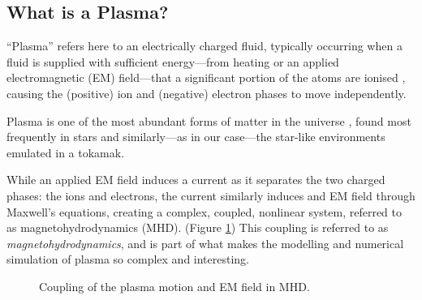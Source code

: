 \subsection{What is a Plasma?}
    \begin{definition}[Plasma]
        ``Plasma'' refers here to an electrically charged fluid, typically occurring when a fluid is supplied with sufficient energy—from heating or an applied electromagnetic (EM) field—that a significant portion of the atoms  are ionised , causing the (positive) ion and (negative) electron phases to move independently.
    \end{definition}
    Plasma is one of the most abundant forms of matter in the universe \cite{CL13}, found most frequently in stars \cite{Phi95, Asc06, Pie17} and similarly—as in our case—the star-like environments emulated in a tokamak.
    
    While an applied EM field induces a current as it separates the two charged phases: the ions and electrons, the current similarly induces and EM field through Maxwell's equations, creating a complex, coupled, nonlinear system, referred to as magnetohydrodynamics (MHD). (Figure \ref{MHD coupling}) \BA{[Ref.]} This coupling is referred to as \emph{magnetohydrodynamics}, and is part of what makes the modelling and numerical simulation of plasma so complex and interesting.
    \begin{figure}[!h]
        \centering
        \caption{Coupling of the plasma motion and EM field in MHD.}
        \label{MHD coupling}
    \end{figure}
    